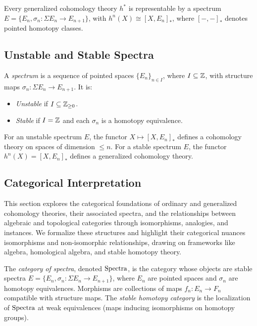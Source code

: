 \documentclass{article}
\begin{document}
\begin{theorem}
Every generalized cohomology theory \( h^* \) is representable
by a spectrum \( E = \{ E_n, \sigma_n: \Sigma E_n \to E_{n+1} \} \),
with \( h^n(X) \cong [X, E_n]_* \), where \( [-, -]_* \) denotes
pointed homotopy classes.
\end{theorem}

\subsection{Unstable and Stable Spectra}

\begin{definition}
A \emph{spectrum} is a sequence of pointed spaces \( \{ E_n \}_{n \in I} \),
where \( I \subseteq \mathbb{Z} \), with structure maps \( \sigma_n: \Sigma E_n \to E_{n+1} \). It is:
\begin{itemize}
    \item \emph{Unstable} if \( I \subseteq \mathbb{Z}_{\geq 0} \).
    \item \emph{Stable} if \( I = \mathbb{Z} \) and each \( \sigma_n \) is a homotopy equivalence.
\end{itemize}
\end{definition}

\begin{theorem}
For an unstable spectrum \( E \), the functor \( X \mapsto [X, E_n]_* \) defines a cohomology theory on spaces of dimension \( \leq n \). For a stable spectrum \( E \), the functor \( h^n(X) = [X, E_n]_* \) defines a generalized cohomology theory.
\end{theorem}

\subsection{Categorical Interpretation}

This section explores the categorical foundations of ordinary and generalized cohomology theories, their associated spectra, and the relationships between algebraic and topological categories through isomorphisms, analogies, and instances. We formalize these structures and highlight their categorical nuances isomorphisms and non-isomorphic relationships, drawing on frameworks like algebra, homological algebra, and stable homotopy theory.

\begin{definition}
The \emph{category of spectra}, denoted \( \text{Spectra} \), is the category whose objects are stable spectra \( E = \{ E_n, \sigma_n: \Sigma E_n \to E_{n+1} \} \), where \( E_n \) are pointed spaces and \( \sigma_n \) are homotopy equivalences. Morphisms are collections of maps \( f_n: E_n \to F_n \) compatible with structure maps. The \emph{stable homotopy category} is the localization of \( \text{Spectra} \) at weak equivalences (maps inducing isomorphisms on homotopy groups).
\end{definition}
\end{document}

